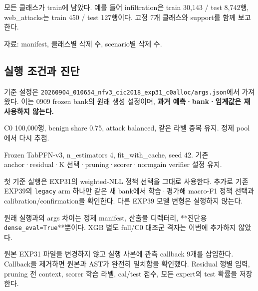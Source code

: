 \par\noindent \textbullet\enspace 모든 클래스가 train에 남았다. 예를 들어 infiltration은 train 30,143 /\allowbreak{} test 8,742행, web\_\allowbreak{}attacks는 train 450 /\allowbreak{} test 127행이다. 고정 7개 클래스와 support를 함께 보고한다.


자료: manifest, 클래스별 삭제 수, scenario별 삭제 수.

\subsection{실행 조건과 진단}
기준 설정은 \texttt{20260904\allowbreak{}\_\allowbreak{}\allowbreak{}010654\_\allowbreak{}\allowbreak{}nfv3\_\allowbreak{}\allowbreak{}cic\allowbreak{}2018\_\allowbreak{}\allowbreak{}exp\allowbreak{}31\_\allowbreak{}\allowbreak{}c0all\allowbreak{}oc/\allowbreak{}\allowbreak{}args.\allowbreak{}json}에서 가져왔다. 이는 0909 frozen bank의 원래 생성 설정이며, \textbf{과거 예측·bank·임계값은 재사용하지 않는다.}

\par\noindent \textbullet\enspace C0 100,000행, benign share 0.75, attack balanced, 같은 라벨 중복 유지. 정제 pool에서 다시 추첨.


\par\noindent \textbullet\enspace Frozen TabPFN-v3, n\_\allowbreak{}estimators 4, fit\_\allowbreak{}with\_\allowbreak{}cache, seed 42. 기존 anchor·residual·K 선택·pruning·scorer·normgain verifier 설정 유지.


\par\noindent \textbullet\enspace 첫 기준 실행은 EXP31의 weighted-NLL 정책 선택을 그대로 사용한다. 추가로 기존 EXP39의 \texttt{legacy} arm 하나만 같은 새 bank에서 학습·평가해 macro-F1 정책 선택과 calibration/\allowbreak{}confirmation을 확인한다. 다른 EXP39 모델 변형은 실행하지 않는다.


\par\noindent \textbullet\enspace 원래 실행과의 args 차이는 정제 manifest, 산출물 디렉터리, **진단용 \texttt{dense\_\allowbreak{}\allowbreak{}ev\allowbreak{}al=\allowbreak{}\allowbreak{}True}**뿐이다. XGB 별도 full/\allowbreak{}C0 대조군 격자는 이번에 추가하지 않았다.


\par\noindent \textbullet\enspace 원본 EXP31 파일을 변경하지 않고 실행 사본에 관측 callback 9개를 삽입한다. Callback을 제거하면 원본과 AST가 완전히 일치함을 확인했다. Residual 행별 입력, pruning 전 context, scorer 학습 라벨, cal/\allowbreak{}test 점수, 모든 expert의 test 확률을 저장한다.


